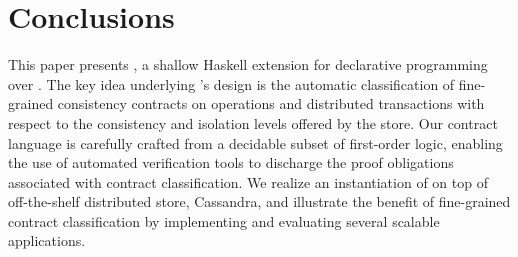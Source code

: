 \section{Conclusions}
\label{sec:concl}

This paper presents \name, a shallow Haskell extension for declarative
programming over \ecds. The key idea underlying \name's design is the automatic
classification of fine-grained consistency contracts on operations and
distributed transactions with respect to the consistency and isolation levels
offered by the store. Our contract language is carefully crafted from a
decidable subset of first-order logic, enabling the use of automated
verification tools to discharge the proof obligations associated with contract
classification. We realize an instantiation of \name on top of off-the-shelf
distributed store, Cassandra, and illustrate the benefit of fine-grained
contract classification by implementing and evaluating several scalable
applications.
